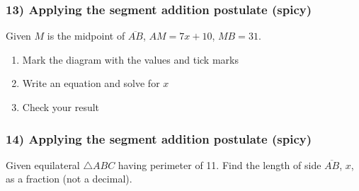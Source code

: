 \documentclass{beamer}
\begin{document}
  \frame
  {
    \frametitle{13) Applying the segment addition postulate (spicy)}
    Given $M$ is the midpoint of $\overline{AB}$, $AM=7x+10$, $MB=31$.
    \begin{enumerate}
      \item Mark the diagram with the values and tick marks
      \item Write an equation and solve for $x$
      \item Check your result
    \end{enumerate} \vspace{1cm}
      \begin{center}
      \end{center} \vspace{4cm}
  }

  \frame
  {
    \frametitle{14) Applying the segment addition postulate (spicy)}
      Given equilateral $\triangle ABC$ having perimeter of 11. Find the length of side $\overline{AB}$, $x$, as a fraction (not a decimal).\vspace{1cm}
      \begin{center}
      \end{center}
  }
\end{document}

